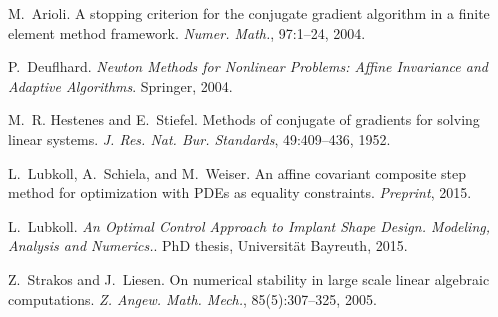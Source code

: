 
\begin{DoxyDescription}
\item[\label{_CITEREF_Arioli2004}%
\mbox{[}1\mbox{]}]M.~Arioli. A stopping criterion for the conjugate gradient algorithm in a finite element method framework. {\itshape Numer. Math.}, 97\+:1--24, 2004. 


\item[\label{_CITEREF_Deuflhard2004}%
\mbox{[}2\mbox{]}]P.~Deuflhard. {\itshape Newton Methods for Nonlinear Problems\+: Affine Invariance and Adaptive Algorithms}. Springer, 2004.


\item[\label{_CITEREF_Hestenes1952}%
\mbox{[}3\mbox{]}]M.~R. Hestenes and E.~Stiefel. Methods of conjugate of gradients for solving linear systems. {\itshape J. Res. Nat. Bur. Standards}, 49\+:409--436, 1952.


\item[\label{_CITEREF_Lubkoll2015a}%
\mbox{[}4\mbox{]}]L.~Lubkoll, A.~Schiela, and M.~Weiser. An affine covariant composite step method for optimization with P\+D\+Es as equality constraints. {\itshape Preprint}, 2015.


\item[\label{_CITEREF_Lubkoll2015}%
\mbox{[}5\mbox{]}]L.~Lubkoll. {\itshape An Optimal Control Approach to Implant Shape Design. Modeling, Analysis and Numerics.}. PhD thesis, Universit\"{a}t Bayreuth, 2015.


\item[\label{_CITEREF_Strakos2005}%
\mbox{[}6\mbox{]}]Z.~Strakos and J.~Liesen. On numerical stability in large scale linear algebraic computations. {\itshape Z. Angew. Math. Mech.}, 85(5)\+:307--325, 2005. 


\end{DoxyDescription}